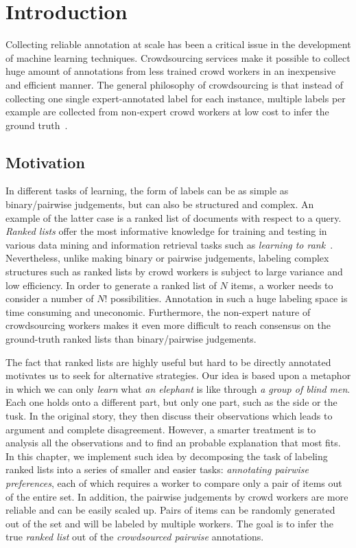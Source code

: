 \section{Introduction}

Collecting reliable annotation at scale has been a critical issue in the
development of machine learning techniques. Crowdsourcing services make it
possible to collect huge amount of annotations from less trained crowd workers
in an inexpensive and efficient manner. The general philosophy of crowdsourcing
is that instead of collecting one single expert-annotated label for each
instance, multiple labels per example are collected from non-expert crowd
workers at low cost to infer the ground
truth~\cite{welinder2010multidimensional,whitehill2009whose}.

\subsection{Motivation}

In different tasks of learning, the form of labels can
be as simple as binary/pairwise judgements, but can also be structured and
complex.  An example of the latter case is a ranked list of documents with
respect to a query. \emph{Ranked lists} offer the most informative knowledge for
training and testing in various data mining and information retrieval tasks such
as \emph{learning to rank}~\cite{valizadegan2009learning,yue2007support}.
Nevertheless, unlike making binary or pairwise judgements, labeling complex
structures such as ranked lists by crowd workers is subject to large variance
and low efficiency. In order to generate a ranked list of $N$ items, a worker
needs to consider a number of $N!$ possibilities. Annotation in such a huge
labeling space is time consuming and uneconomic. Furthermore, the non-expert
nature of crowdsourcing workers makes it even more difficult to reach  consensus
on the ground-truth ranked lists than binary/pairwise judgements.

The fact that ranked lists are highly useful but hard to be directly annotated
motivates us to seek for alternative strategies.  Our idea is based upon a
metaphor in which we can only \emph{learn} what \emph{an elephant} is like
through \emph{a group of blind men}. Each one holds onto a different part, but
only one part, such as the side or the tusk. In the original story, they then
discuss their observations which leads to argument and complete disagreement.
However, a smarter treatment is to analysis all the observations and to find an
probable explanation that most fits. In this chapter, we implement such idea by
decomposing the task of labeling ranked lists into a series of smaller and
easier tasks: \textit{annotating pairwise preferences}, each of which requires a
worker to compare only a pair of items out of the entire set.  In addition, the
pairwise judgements by crowd workers are more reliable and can be easily scaled
up. Pairs of items can be randomly generated out of the set and will be labeled
by multiple workers.  The goal is to infer the true \emph{ranked list} out of
the \emph{crowdsourced pairwise} annotations.

